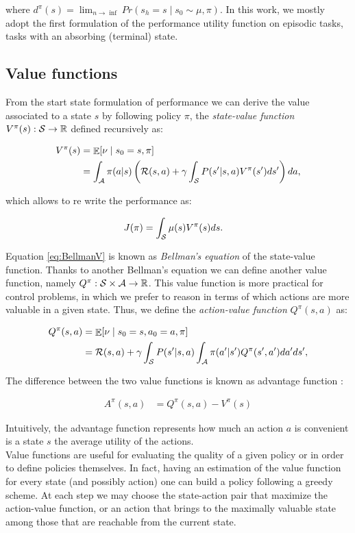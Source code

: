where $d^{\pi}(s) = \lim_{n\to\inf} Pr(s_h=s\mid s_0\sim\mu,\pi)$. In this work, we mostly adopt the first formulation of the performance utility function on episodic tasks, \ie tasks with an absorbing (terminal) state.

\subsection{Value functions}
From the start state formulation of performance we can derive the value associated to a state $s$ by following  policy $\pi$, \ie the \emph{state-value function} $V^{\pi}(s):\mathcal{S}\to\mathbb{R}$ defined recursively as:

\begin{align}
V^{\pi}(s)
&=  \mathop{\mathbb{E}}[\nu\mid s_0=s,\pi]\\
&=  \int_{\mathcal{A}}\pi(a|s)\left(\mathcal{R}(s,a)+\gamma\int_{\mathcal{S}}P(s'|s, a)V^{\pi}(s')ds'\right)da \label{eq:BellmanV},
\end{align}

which allows to re write the performance as:

\begin{align}
J(\pi) &=  \int_{\mathcal{S}}\mu(s)V^{\pi}(s)ds.
\end{align}


Equation \ref{eq:BellmanV} is known as \emph{Bellman's equation} of the state-value function. Thanks to another Bellman's equation we can define another value function, namely $Q^{\pi}:\mathcal{S}\times\mathcal{A}\to\mathbb{R}$. This value function is more practical for control problems, in which we prefer to reason in terms of which actions are more valuable in a given state. Thus, we define the \emph{action-value function} $Q^{\pi}(s,a)$ as:

\begin{align}
Q^{\pi}(s,a)
&=  \mathop{\mathbb{E}}[\nu\mid s_0=s,a_0=a,\pi] \nonumber \\
&=  \mathcal{R}(s,a) + \gamma\int_{\mathcal{S}}P(s'|s, a)\int_{\mathcal{A}}\pi(a'|s')Q^{\pi}(s', a')da'ds' \label{eq:BellmanQ},
\end{align}

The difference between the two value functions is known as advantage function \cite{baird1993advantage}:

\begin{align}
A^{\pi}(s,a) &=  Q^{\pi}(s,a) - V^{\pi}(s)
\end{align}

Intuitively, the advantage function represents how much an action $a$ is convenient is a state $s$ \wrt the average utility of the actions. \\
Value functions are useful for evaluating the quality of a given policy or in order to define policies themselves. In fact, having an estimation of the value function for every state (and possibly action) one can build a policy following a greedy scheme. At each step we may choose the state-action pair that maximize the action-value function, or an action that brings to the maximally valuable state among those that are reachable from the current state.

